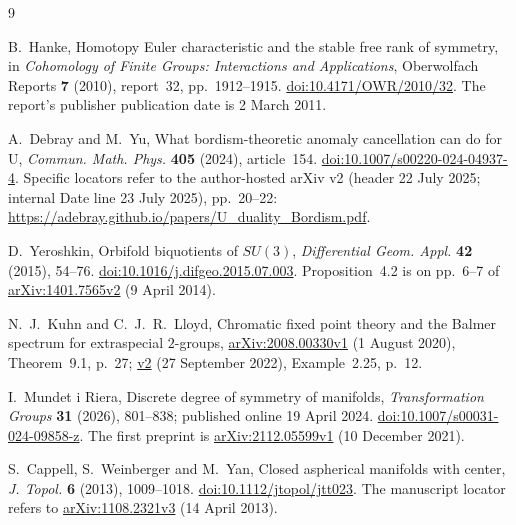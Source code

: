 \documentclass[10pt]{article}
\begin{document}
\begin{thebibliography}{9}
\raggedright
{}
B.~Hanke, Homotopy Euler characteristic and the stable free rank of symmetry,
in \emph{Cohomology of Finite Groups: Interactions and Applications},
Oberwolfach Reports \textbf{7} (2010), report~32, pp.~1912--1915.
\href{https://doi.org/10.4171/OWR/2010/32}{doi:10.4171/OWR/2010/32}.
The report's publisher publication date is 2 March 2011.

A.~Debray and M.~Yu,
What bordism-theoretic anomaly cancellation can do for U,
\emph{Commun. Math. Phys.} \textbf{405} (2024), article~154.
\href{https://doi.org/10.1007/s00220-024-04937-4}{doi:10.1007/s00220-024-04937-4}.
Specific locators refer to the author-hosted arXiv v2 (header 22 July 2025;
internal Date line 23 July 2025), pp.~20--22: \url{https://adebray.github.io/papers/U_duality_Bordism.pdf}.

D.~Yeroshkin, Orbifold biquotients of \(SU(3)\),
\emph{Differential Geom. Appl.} \textbf{42} (2015), 54--76.
\href{https://doi.org/10.1016/j.difgeo.2015.07.003}{doi:10.1016/j.difgeo.2015.07.003}.
Proposition~4.2 is on pp.~6--7 of
\href{https://arxiv.org/abs/1401.7565v2}{arXiv:1401.7565v2} (9 April 2014).

N.~J.~Kuhn and C.~J.~R.~Lloyd,
Chromatic fixed point theory and the Balmer spectrum for extraspecial \(2\)-groups,
\href{https://arxiv.org/abs/2008.00330v1}{arXiv:2008.00330v1}
(1 August 2020), Theorem~9.1, p.~27;
\href{https://arxiv.org/abs/2008.00330v2}{v2}
(27 September 2022), Example~2.25, p.~12.

I.~Mundet i Riera, Discrete degree of symmetry of manifolds,
\emph{Transformation Groups} \textbf{31} (2026), 801--838;
published online 19 April 2024.
\href{https://doi.org/10.1007/s00031-024-09858-z}{doi:10.1007/s00031-024-09858-z}.
The first preprint is
\href{https://arxiv.org/abs/2112.05599v1}{arXiv:2112.05599v1}
(10 December 2021).

S.~Cappell, S.~Weinberger and M.~Yan,
Closed aspherical manifolds with center,
\emph{J. Topol.} \textbf{6} (2013), 1009--1018.
\href{https://doi.org/10.1112/jtopol/jtt023}{doi:10.1112/jtopol/jtt023}.
The manuscript locator refers to
\href{https://arxiv.org/abs/1108.2321v3}{arXiv:1108.2321v3}
(14 April 2013).
\end{thebibliography}
\end{document}
